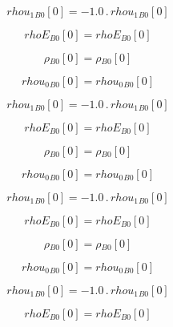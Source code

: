 \documentclass{article}
\begin{document}
\begin{dmath}{rhou_{1}{_{B0}}}[{0}] = - 1.0 \,.\, {rhou_{1}{_{B0}}}[{0}]\end{dmath}

\begin{dmath}{rhoE{_{B0}}}[{0}] = {rhoE{_{B0}}}[{0}]\end{dmath}

\begin{dmath}{\rho{_{B0}}}[{0}] = {\rho{_{B0}}}[{0}]\end{dmath}

\begin{dmath}{rhou_{0}{_{B0}}}[{0}] = {rhou_{0}{_{B0}}}[{0}]\end{dmath}

\begin{dmath}{rhou_{1}{_{B0}}}[{0}] = - 1.0 \,.\, {rhou_{1}{_{B0}}}[{0}]\end{dmath}

\begin{dmath}{rhoE{_{B0}}}[{0}] = {rhoE{_{B0}}}[{0}]\end{dmath}

\begin{dmath}{\rho{_{B0}}}[{0}] = {\rho{_{B0}}}[{0}]\end{dmath}

\begin{dmath}{rhou_{0}{_{B0}}}[{0}] = {rhou_{0}{_{B0}}}[{0}]\end{dmath}

\begin{dmath}{rhou_{1}{_{B0}}}[{0}] = - 1.0 \,.\, {rhou_{1}{_{B0}}}[{0}]\end{dmath}

\begin{dmath}{rhoE{_{B0}}}[{0}] = {rhoE{_{B0}}}[{0}]\end{dmath}

\begin{dmath}{\rho{_{B0}}}[{0}] = {\rho{_{B0}}}[{0}]\end{dmath}

\begin{dmath}{rhou_{0}{_{B0}}}[{0}] = {rhou_{0}{_{B0}}}[{0}]\end{dmath}

\begin{dmath}{rhou_{1}{_{B0}}}[{0}] = - 1.0 \,.\, {rhou_{1}{_{B0}}}[{0}]\end{dmath}

\begin{dmath}{rhoE{_{B0}}}[{0}] = {rhoE{_{B0}}}[{0}]\end{dmath}
\end{document}
